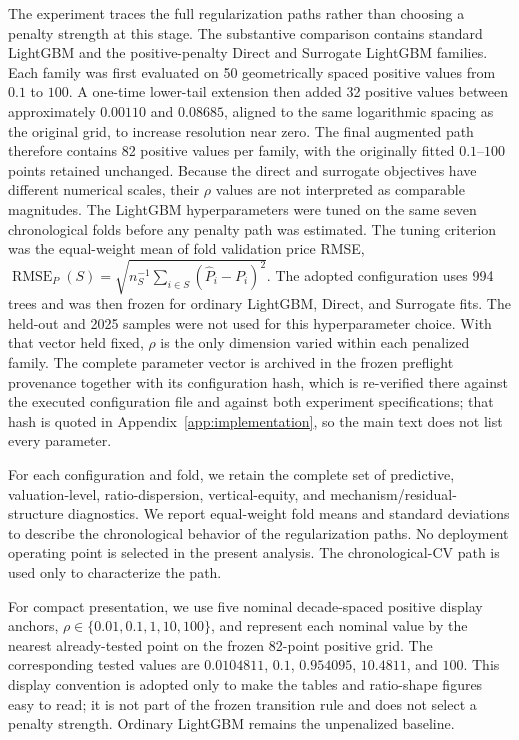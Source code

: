 \documentclass[10pt]{article}
\theoremstyle{definition}
\newcommand{\1}{\mathbf{1}}
\begin{document}
The experiment traces the full regularization paths rather than choosing a penalty
strength at this stage.
The substantive comparison contains standard LightGBM and the positive-penalty Direct and Surrogate LightGBM families.
Each family was first evaluated on 50 geometrically spaced positive values from $0.1$ to $100$. A one-time lower-tail extension then added 32 positive values between approximately $0.00110$ and $0.08685$, aligned to the same logarithmic spacing as the original grid, to increase resolution near zero. The final augmented path therefore contains 82 positive values per family, with the originally fitted $0.1$--$100$ points retained unchanged.
Because the direct and surrogate objectives have different numerical scales, their $\rho$
values are not interpreted as comparable magnitudes. The LightGBM hyperparameters were tuned on the same seven chronological folds before any penalty path was estimated. The tuning criterion was the equal-weight mean of fold validation price RMSE, $\operatorname{RMSE}_P(S)=\sqrt{n_S^{-1}\sum_{i\in S}(\widehat P_i-P_i)^2}$. The adopted configuration uses 994 trees and was then frozen for ordinary LightGBM, Direct, and Surrogate fits. The held-out and 2025 samples were not used for this hyperparameter choice. With that vector held fixed, $\rho$ is the only dimension varied within each penalized family. The complete parameter vector is archived in the frozen preflight provenance together with its configuration hash, which is re-verified there against the executed configuration file and against both experiment specifications; that hash is quoted in Appendix~\ref{app:implementation}, so the main text does not list every parameter.


For each configuration and fold, we retain the complete set of predictive,
valuation-level, ratio-dispersion, vertical-equity, and mechanism/residual-structure diagnostics.
We report equal-weight fold means and standard deviations to describe the
chronological behavior of the regularization paths.
No deployment operating point is selected in the present analysis. The chronological-CV path is used only to characterize the path.

For compact presentation, we use five nominal decade-spaced positive display anchors, $\rho\in\{0.01,\allowbreak 0.1,\allowbreak 1,\allowbreak 10,\allowbreak 100\}$, and represent each nominal value by the nearest already-tested point on the frozen 82-point positive grid. The corresponding tested values are $0.0104811$, $0.1$, $0.954095$, $10.4811$, and $100$. This display convention is adopted only to make the tables and ratio-shape figures easy to read; it is not part of the frozen transition rule and does not select a penalty strength. Ordinary LightGBM remains the unpenalized baseline.
\end{document}
